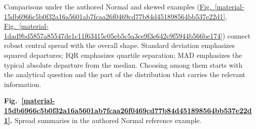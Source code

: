 \documentclass[11pt,a4paper]{article}
\begin{document}
\medskip

Comparisons under the authored Normal and skewed examples (\hyperref[material-15db6966c5b0f32a16a5601ab7fcaa26f0469cd77b84d451898564bb537e22d1]{Fig.~\ref*{material-15db6966c5b0f32a16a5601ab7fcaa26f0469cd77b84d451898564bb537e22d1}}, \hyperref[material-1dad9bd5857a85547de1c11f63415c05eb5c5a3ce9f3e642c9f5944b566be174]{Fig.~\ref*{material-1dad9bd5857a85547de1c11f63415c05eb5c5a3ce9f3e642c9f5944b566be174}}) connect robust central spread with the overall shape. Standard deviation emphasizes squared departures; IQR emphasizes quartile separation; MAD emphasizes the typical absolute departure from the median. Choosing among them starts with the analytical question and the part of the distribution that carries the relevant information.


\par\medskip
\Needspace{10cm}
\label{material-15db6966c5b0f32a16a5601ab7fcaa26f0469cd77b84d451898564bb537e22d1}
\noindent\textbf{Fig.~\ref*{material-15db6966c5b0f32a16a5601ab7fcaa26f0469cd77b84d451898564bb537e22d1}.} Spread summaries in the authored Normal reference example.\par\nopagebreak
\end{document}
